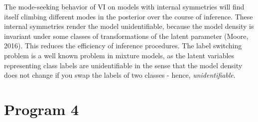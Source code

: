 \documentclass[10pt]{homeworg}
\begin{document}
The mode-seeking behavior of VI on models with internal symmetries will find itself climbing different modes in the posterior over the course of inference. These internal symmetries render the model unidentifiable, because the model density is invariant under some classes of transformations of the latent parameter (Moore, 2016). This reduces the efficiency of inference procedures. The label switching problem is a well known problem in mixture models, as the latent variables representing class labels are unidentifiable in the sense that the model density does not change if you swap the labels of two classes - hence, \textit{unidentifiable}.



\section*{Program 4}
\end{document}
